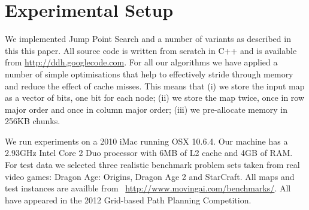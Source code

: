 \section{Experimental Setup}
\label{sec::setup}
We implemented Jump Point Search and a number of variants as described
in this this paper. All source code is written from scratch in C++ and is 
available from {\small \url{http://ddh.googlecode.com}}.
For all our algorithms we have applied a number of simple optimisations 
that help to effectively stride through memory and reduce the effect of 
cache misses.
This means that (i) we store the input map as a vector of bits, one bit 
for each node; (ii) we store the map twice, once in row major order and 
once in column major order; (iii) we pre-allocate memory in 256KB chunks.

We run experiments on a 2010 iMac running OSX 10.6.4. Our machine has 
a 2.93GHz Intel Core 2 Duo processor with 6MB of L2 cache and 4GB of RAM.
For test data we selected three realistic benchmark problem sets taken from
real video games: Dragon Age: Origins, Dragon Age 2 and StarCraft.  
All maps and test instances are availble from 
~{\small \url{http://www.movingai.com/benchmarks/}}.
All have appeared in the 2012 Grid-based Path Planning Competition. 
